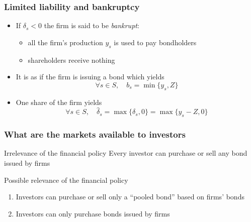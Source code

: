 \documentclass[blue]{beamer}
\theoremstyle{definition}
\theoremstyle{example}
\begin{document}

\begin{frame}\frametitle{Limited liability and bankruptcy}

\begin{itemize}
\item If $\delta_s <0$ the firm is said to be {\em bankrupt}:
    \begin{itemize}
    \item all the firm's production $y_s$ is used to pay bondholders
    \item shareholders receive nothing
    \end{itemize}
\item It is as if the firm is issuing a bond which yields
\[
\forall s \in S, \quad b_s = \min\{y_s,Z\}
\]
\item One share of the firm yields
\[
\forall s\in S, \quad \widehat{\delta}_s = \max\{\delta_s,0\} = \max\{y_s - Z,0\}
\]
\end{itemize}

\end{frame}



\begin{frame}\frametitle{What are the markets available to investors}

\begin{block}{Irrelevance of the financial policy}
Every investor can purchase or sell any bond issued by firms
\end{block}

\begin{block}{Possible relevance of the financial policy}
\begin{enumerate}
\item Investors can purchase or sell only a ``pooled bond'' based on firms' bonds
\item Investors can only purchase bonds issued by firms
\end{enumerate}
\end{block}

\end{frame}
\end{document}
